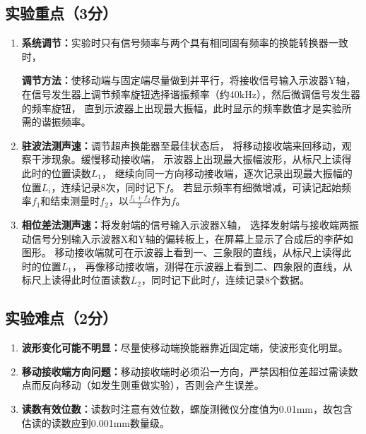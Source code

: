 \documentclass{../template/Preport}
\begin{document}
\subsection{实验重点（3分）}
\begin{enumerate}
	\item \textbf{系统调节：}实验时只有信号频率与两个具有相同固有频率的换能转换器一致时，

	      \textbf{调节方法：}使移动端与固定端尽量做到并平行，将接收信号输入示波器Y轴，
	      在信号发生器上调节频率旋钮选择谐振频率（约40\si{\kilo\hertz}），然后微调信号发生器的频率旋钮，
	      直到示波器上出现最大振幅，此时显示的频率数值才是实验所需的谐振频率。

	\item \textbf{驻波法测声速：}调节超声换能器至最佳状态后，
	      将移动接收端来回移动，观察干涉现象。缓慢移动接收端，
	      示波器上出现最大振幅波形，从标尺上读得此时的位置读数$L_1$，
	      继续向同一方向移动接收端，逐次记录出现最大振幅的位置$L_i$，连续记录8次，同时记下$f$。
	      若显示频率有细微增减，可读记起始频率$f_1$和结束测量时$f_2$，以$\frac{f_1+f_2}{2}$作为$f$。

	\item \textbf{相位差法测声速：}将发射端的信号输入示波器X轴，
	      选择发射端与接收端两振动信号分别输入示波器X和Y轴的偏转板上，在屏幕上显示了合成后的李萨如图形。
	      移动接收端就可在示波器上看到一、三象限的直线，从标尺上读得此时的位置$L_1$，
	      再像移动接收端，测得在示波器上看到二、四象限的直线，从标尺上读得此时位置读数$L_2$，同时记下此时$f$，连续记录8个数据。
\end{enumerate}
\subsection{实验难点（2分）}
\begin{enumerate}
	\item \textbf{波形变化可能不明显：}尽量使移动端换能器靠近固定端，使波形变化明显。
	\item \textbf{移动接收端方向问题：}移动接收端时必须沿一方向，严禁因相位差超过需读数点而反向移动（如发生则重做实验），否则会产生误差。
	\item \textbf{读数有效位数：}读数时注意有效位数，螺旋测微仪分度值为0.01\si{\milli\metre}，故包含估读的读数应到0.001\si{\milli\metre}数量级。
\end{enumerate}

\end{document}
